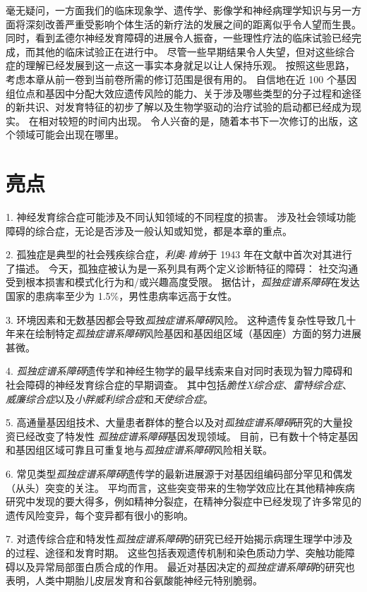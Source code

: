 毫无疑问，一方面我们的临床现象学、遗传学、影像学和神经病理学知识与另一方面将深刻改善严重受影响个体生活的新疗法的发展之间的距离似乎令人望而生畏。
同时，看到孟德尔神经发育障碍的进展令人振奋，一些理性疗法的临床试验已经完成，而其他的临床试验正在进行中。
尽管一些早期结果令人失望，但对这些综合症的理解已经发展到这一点这一事实本身就足以让人保持乐观。
按照这些思路，考虑本章从前一卷到当前卷所需的修订范围是很有用的。
自信地在近 100 个基因组位点和基因中分配大效应遗传风险的能力、关于涉及哪些类型的分子过程和途径的新共识、对发育特征的初步了解以及生物学驱动的治疗试验的启动都已经成为现实。
在相对较短的时间内出现。
令人兴奋的是，随着本书下一次修订的出版，这个领域可能会出现在哪里。



\section{亮点}

1. 神经发育综合症可能涉及不同认知领域的不同程度的损害。
涉及社会领域功能障碍的综合症，无论是否涉及一般认知或知觉，都是本章的重点。


2. 孤独症是典型的社会残疾综合症，\textit{利奥$\cdot$肯纳}于 1943 年在文献中首次对其进行了描述。
今天，孤独症被认为是一系列具有两个定义诊断特征的障碍：
社交沟通受到根本损害和模式化行为和/或兴趣高度受限。
据估计，\textit{孤独症谱系障碍}在发达国家的患病率至少为 1.5\%，男性患病率远高于女性。


3. 环境因素和无数基因都会导致\textit{孤独症谱系障碍}风险。
这种遗传复杂性导致几十年来在绘制特定\textit{孤独症谱系障碍}风险基因和基因组区域（基因座）方面的努力进展甚微。


4. \textit{孤独症谱系障碍}遗传学和神经生物学的最早线索来自对同时表现为智力障碍和社会障碍的神经发育综合症的早期调查。
其中包括\textit{脆性X综合症}、\textit{雷特综合症}、\textit{威廉综合症}以及\textit{小胖威利综合症}和\textit{天使综合症}。 


5. 高通量基因组技术、大量患者群体的整合以及对\textit{孤独症谱系障碍}研究的大量投资已经改变了特发性 \textit{孤独症谱系障碍}基因发现领域。
目前，已有数十个特定基因和基因组区域可靠且可重复地与\textit{孤独症谱系障碍}风险相关联。 


6. 常见类型\textit{孤独症谱系障碍}遗传学的最新进展源于对基因组编码部分罕见和偶发（从头）突变的关注。
平均而言，这些突变带来的生物学效应比在其他精神疾病研究中发现的要大得多，例如精神分裂症，在精神分裂症中已经发现了许多常见的遗传风险变异，每个变异都有很小的影响。


7. 对遗传综合症和特发性\textit{孤独症谱系障碍}的研究已经开始揭示病理生理学中涉及的过程、途径和发育时期。
这些包括表观遗传机制和染色质动力学、突触功能障碍以及异常局部蛋白质合成的作用。
最近对基因决定的\textit{孤独症谱系障碍}的研究也表明，人类中期胎儿皮层发育和谷氨酸能神经元特别脆弱。


